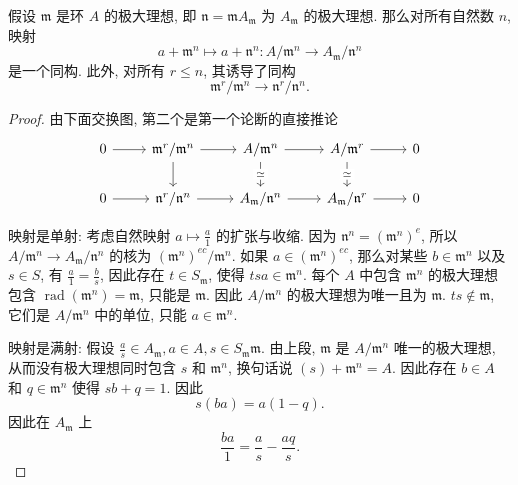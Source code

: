 \begin{proposition}
  假设 \( \mathfrak{m} \) 是环 \( A \) 的极大理想, 即 \( \mathfrak{n} =
  \mathfrak{m} A_{\mathfrak{m}} \) 为 \( A_{\mathfrak{m}} \) 的极大理想.
  那么对所有自然数 \( n \), 映射
  \[
    a + \mathfrak{m}^n \mapsto a + \mathfrak{n}^n: A / \mathfrak{m}^n \to
    A_{\mathfrak{m}} / \mathfrak{n}^n
  \]
  是一个同构. 此外, 对所有 \( r \leq n \), 其诱导了同构
  \[
    \mathfrak{m}^r / \mathfrak{m}^n \to \mathfrak{n}^r / \mathfrak{n}^n.
  \]
\end{proposition}
\begin{proof}
  由下面交换图, 第二个是第一个论断的直接推论
\[\begin{tikzcd}
	0 & {\mathfrak{m}^r / \mathfrak{m}^n} & {A / \mathfrak{m}^n} & {A / \mathfrak{m}^r} & 0 \\
	0 & {\mathfrak{n}^r / \mathfrak{n}^n} & {A_{\mathfrak{m}} / \mathfrak{n}^n} & {A_{\mathfrak{m}} / \mathfrak{n}^r} & 0
	\arrow[from=1-1, to=1-2]
	\arrow[from=1-2, to=1-3]
	\arrow[from=1-2, to=2-2]
	\arrow[from=1-3, to=1-4]
	\arrow["\simeq"{description}, from=1-3, to=2-3]
	\arrow[from=1-4, to=1-5]
	\arrow["\simeq"{description}, from=1-4, to=2-4]
	\arrow[from=2-1, to=2-2]
	\arrow[from=2-2, to=2-3]
	\arrow[from=2-3, to=2-4]
	\arrow[from=2-4, to=2-5]
\end{tikzcd}\]

映射是单射: 考虑自然映射 \( a \mapsto \frac{a}{1} \) 的扩张与收缩. 因为 \(
\mathfrak{n}^n = (\mathfrak{m}^n)^e \), 所以 \( A / \mathfrak{m}^n \to
A_{\mathfrak{m}} / \mathfrak{n}^n \) 的核为 \( (\mathfrak{m}^n)^{ec} /
\mathfrak{m}^n \). 如果 \( a \in (\mathfrak{m}^n)^{ec} \), 那么对某些 \( b \in
\mathfrak{m}^n \) 以及 \( s \in S\), 有 \( \frac{a}{1} = \frac{b}{s} \),
因此存在 \( t \in S_{\mathfrak{m}} \), 使得 \( tsa \in \mathfrak{m}^n \). 每个
\( A \) 中包含 \( \mathfrak{m}^n \) 的极大理想 包含 \(
\operatorname{rad}(\mathfrak{m}^n) = \mathfrak{m} \), 只能是 \( \mathfrak{m} \).
因此 \( A/ \mathfrak{m}^n \) 的极大理想为唯一且为 \( \mathfrak{m} \). \( ts
\notin \mathfrak{m} \), 它们是 \( A / \mathfrak{m}^n \) 中的单位, 只能 \( a \in
\mathfrak{m}^n \).

映射是满射: 假设 \( \frac{a}{s} \in A_{\mathfrak{m}}, a \in A, s \in S_{\mathfrak{m}}
\mathfrak{m}\). 由上段, \( \mathfrak{m} \) 是 \( A / \mathfrak{m}^n \)
唯一的极大理想, 从而没有极大理想同时包含 \( s \) 和 \( \mathfrak{m}^n \),
换句话说 \( (s) + \mathfrak{m}^n = A \). 因此存在 \( b \in A \) 和 \( q \in
\mathfrak{m}^n \) 使得 \( sb + q = 1 \). 因此
\[
  s(ba) = a(1 - q).
\]
因此在 \( A_{\mathfrak{m}} \) 上
\[
  \frac{ba}{1} = \frac{a}{s} - \frac{aq}{s}.
\]
\end{proof}

